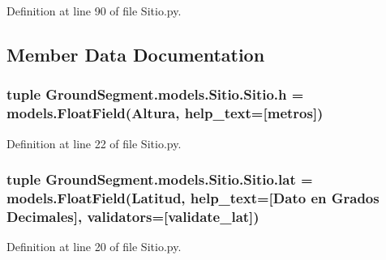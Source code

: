 Definition at line 90 of file Sitio.\+py.



\subsection{Member Data Documentation}
\hypertarget{class_ground_segment_1_1models_1_1_sitio_1_1_sitio_a0345de18d6f8cc930f291c639a915366}{}
\subsubsection[{h}]{\setlength{\rightskip}{0pt plus 5cm}tuple Ground\+Segment.\+models.\+Sitio.\+Sitio.\+h = models.\+Float\+Field(\textquotesingle{}Altura\textquotesingle{}, help\+\_\+text=\textquotesingle{}\mbox{[}metros\mbox{]}\textquotesingle{})\hspace{0.3cm}{\ttfamily [static]}}\label{class_ground_segment_1_1models_1_1_sitio_1_1_sitio_a0345de18d6f8cc930f291c639a915366}


Definition at line 22 of file Sitio.\+py.

\hypertarget{class_ground_segment_1_1models_1_1_sitio_1_1_sitio_a981bccda8fdc7772f7ce19d23e3c6bd7}{}
\subsubsection[{lat}]{\setlength{\rightskip}{0pt plus 5cm}tuple Ground\+Segment.\+models.\+Sitio.\+Sitio.\+lat = models.\+Float\+Field(\textquotesingle{}Latitud\textquotesingle{}, help\+\_\+text=\textquotesingle{}\mbox{[}Dato en Grados Decimales\mbox{]}\textquotesingle{}, validators=\mbox{[}validate\+\_\+lat\mbox{]})\hspace{0.3cm}{\ttfamily [static]}}\label{class_ground_segment_1_1models_1_1_sitio_1_1_sitio_a981bccda8fdc7772f7ce19d23e3c6bd7}


Definition at line 20 of file Sitio.\+py.

\hypertarget{class_ground_segment_1_1models_1_1_sitio_1_1_sitio_a58939f0d8d5fff5d4807f745c6ba3335}{}
